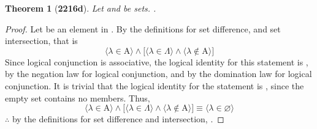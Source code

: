 \documentclass[preview]{standalone}
\newtheorem*{theorem*}{Theorem}
\begin{document}
\begin{theorem*}[\textbf{2216d}] \color{black}
    Let  and \bm{$\Lambda$} be sets. 
    .
\end{theorem*}
\begin{proof} \color{black}
    Let \bm{$\lambda$} be an element in 
    . 
    By the definitions for set difference, 
    and set intersection, that is
    \begin{equation*}
       \Big \langle \lambda \in \mathrm{A} \Big \rangle
            \land
        \bigg[
            \Big \langle \lambda \in \Lambda \Big \rangle
                \land
            \Big \langle \lambda \notin \mathrm{A} \Big \rangle
        \bigg] 
    \end{equation*}
    Since logical conjunction is associative, 
    the logical identity for this statement is \bm{$\bot$}, 
    by the negation law for logical conjunction, 
    and by the domination law for logical conjunction. 
    It is trivial that the logical identity for the statement
    \bm{$\lambda \in \varnothing$} is \bm{$\bot$}, 
    since the empty set contains no members. 
    Thus,
    \begin{equation*}
        \Big \langle \lambda \in \mathrm{A} \Big \rangle
             \land
         \bigg[
             \Big \langle \lambda \in \Lambda \Big \rangle
                 \land
             \Big \langle \lambda \notin \mathrm{A} \Big \rangle
         \bigg] 
            \equiv
        \Big \langle \lambda \in \varnothing \Big \rangle
     \end{equation*}
    $\therefore$ 
    by the definitions for set difference and intersection,
    .
\color{lightgray} \end{proof}
\end{document}
